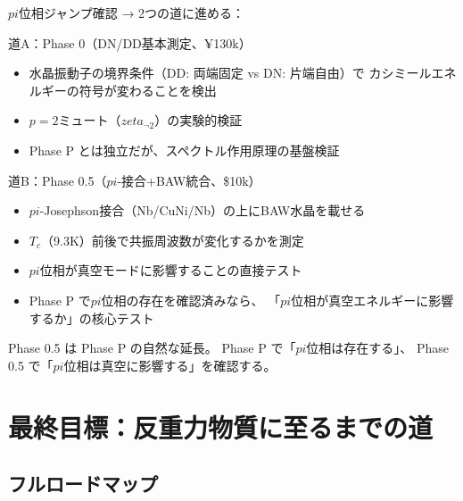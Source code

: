 \documentclass[11pt,a4paper]{article}
\def\pi{pi}%
\def\zeta{zeta}%
\def\textbf#1{#1}%
\begin{document}
\begin{tcolorbox}[colback=blue!5,colframe=blue!60!black,title=Phase P の結果による分岐]

\textbf{$\pi$位相ジャンプ確認} → 2つの道に進める：

\textbf{道A：Phase 0（DN/DD基本測定、¥130k）}
\begin{itemize}
\item 水晶振動子の境界条件（DD: 両端固定 vs DN: 片端自由）で
  カシミールエネルギーの符号が変わることを検出
\item $p=2$ミュート（$\zeta_{\neg 2}$）の実験的検証
\item Phase P とは独立だが、スペクトル作用原理の基盤検証
\end{itemize}

\textbf{道B：Phase 0.5（$\pi$-接合+BAW統合、\$10k）}
\begin{itemize}
\item $\pi$-Josephson接合（Nb/CuNi/Nb）の上にBAW水晶を載せる
\item $T_c$（9.3K）前後で共振周波数が変化するかを測定
\item $\pi$位相が真空モードに影響することの直接テスト
\item Phase P で$\pi$位相の存在を確認済みなら、
  「$\pi$位相が真空エネルギーに影響するか」の核心テスト
\end{itemize}
\end{tcolorbox}

Phase 0.5 は Phase P の自然な延長。
Phase P で「$\pi$位相は存在する」、
Phase 0.5 で「$\pi$位相は真空に影響する」を確認する。


\section{最終目標：反重力物質に至るまでの道}

\subsection{フルロードマップ}
\end{document}
